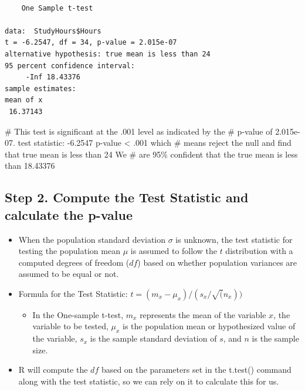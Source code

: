 \documentclass[
  letterpaper,
  DIV=11,
  numbers=noendperiod]{scrreprt}
\newenvironment{Shaded}{\begin{snugshade}}{\end{snugshade}}
\newcommand{\CommentTok}[1]{\textcolor[rgb]{0.37,0.37,0.37}{#1}}
\providecommand{\tightlist}{%
  \setlength{\itemsep}{0pt}\setlength{\parskip}{0pt}}\usepackage{longtable,booktabs,array}
\begin{document}
\begin{verbatim}

    One Sample t-test

data:  StudyHours$Hours
t = -6.2547, df = 34, p-value = 2.015e-07
alternative hypothesis: true mean is less than 24
95 percent confidence interval:
     -Inf 18.43376
sample estimates:
mean of x 
 16.37143 
\end{verbatim}

\begin{Shaded}
\begin{Highlighting}[]
\CommentTok{\# This test is significant at the .001 level as indicated by the}
\CommentTok{\# p{-}value of 2.015e{-}07.  test statistic: {-}6.2547 p{-}value \textless{} .001 which}
\CommentTok{\# means reject the null and find that true mean is less than 24 We}
\CommentTok{\# are 95\% confident that the true mean is less than 18.43376}
\end{Highlighting}
\end{Shaded}

\subsection{Step 2. Compute the Test Statistic and calculate the
p-value}\label{step-2.-compute-the-test-statistic-and-calculate-the-p-value}

\begin{itemize}
\tightlist
\item
  When the population standard deviation \(\sigma\) is unknown, the test
  statistic for testing the population mean \(\mu\) is assumed to follow
  the \(t\) distribution with a computed degrees of freedom (\(df\))
  based on whether population variances are assumed to be equal or not.
\item
  Formula for the Test Statistic: \(t = (m_x-\mu_x)/(s_x/\sqrt(n_x))\)

  \begin{itemize}
  \tightlist
  \item
    In the One-sample t-test, \(m_x\) represents the mean of the
    variable \(x\), the variable to be tested, \(\mu_x\) is the
    population mean or hypothesized value of the variable, \(s_x\) is
    the sample standard deviation of \(s\), and \(n\) is the sample
    size.
  \end{itemize}
\item
  R will compute the \(df\) based on the parameters set in the t.test()
  command along with the test statistic, so we can rely on it to
  calculate this for us.
\end{itemize}
\end{document}
